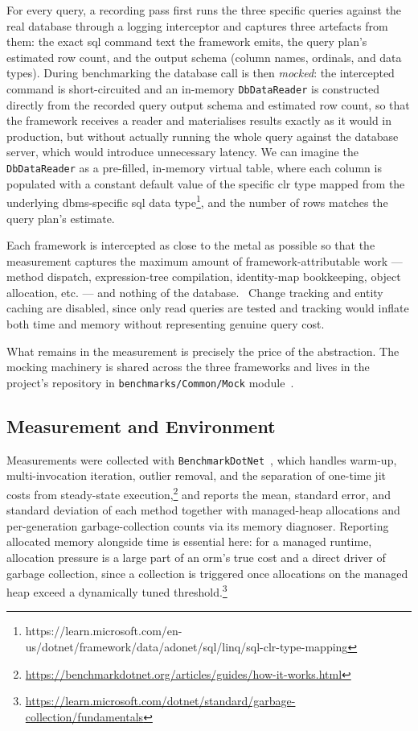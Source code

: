 For every query, a recording pass first runs the three specific queries against the real database through a logging interceptor and captures three artefacts from them: the exact \acrshort{sql} command text the framework emits, the query plan's estimated row count, and the output schema (column names, ordinals, and data types). During benchmarking the database call is then \emph{mocked}: the intercepted command is short-circuited and an in-memory \texttt{DbDataReader} is constructed directly from the recorded query output schema and estimated row count, so that the framework receives a reader and materialises results exactly as it would in production, but without actually running the whole query against the database server, which would introduce unnecessary latency. We can imagine the \texttt{DbDataReader} as a pre-filled, in-memory virtual table, where each column is populated with a constant default value of the specific \Acrfull{clr} type mapped from the underlying \acrshort{dbms}-specific \acrshort{sql} data type\footnote{https://learn.microsoft.com/en-us/dotnet/framework/data/adonet/sql/linq/sql-clr-type-mapping}, and the number of rows matches the query plan's estimate.

Each framework is intercepted as close to the metal as possible so that the measurement captures the maximum amount of framework-attributable work --- method dispatch, expression-tree compilation, identity-map bookkeeping, object allocation, etc. --- and nothing of the database.~\cite{boumaFransBoumaRawDataAccessBencher2026} Change tracking and entity caching are disabled, since only read queries are tested and tracking would inflate both time and memory without representing genuine query cost.

What remains in the measurement is precisely the price of the abstraction. The mocking machinery is shared across the three frameworks and lives in the project's repository in \texttt{benchmarks/Common/Mock} module~\cite{corovcakUOMRepository2026}.

\subsection{Measurement and Environment}
\label{sec:overhead-env}

Measurements were collected with \texttt{BenchmarkDotNet}~\cite{benchmarkdotnet}, which handles warm-up, multi-invocation iteration, outlier removal, and the separation of one-time \acrshort{jit} costs from steady-state execution,\footnote{\url{https://benchmarkdotnet.org/articles/guides/how-it-works.html}} and reports the mean, standard error, and standard deviation of each method together with managed-heap allocations and per-generation garbage-collection counts via its memory diagnoser. Reporting allocated memory alongside time is essential here: for a managed runtime, allocation pressure is a large part of an \acrshort{orm}'s true cost and a direct driver of garbage collection, since a collection is triggered once allocations on the managed heap exceed a dynamically tuned threshold.\footnote{\url{https://learn.microsoft.com/dotnet/standard/garbage-collection/fundamentals}}

